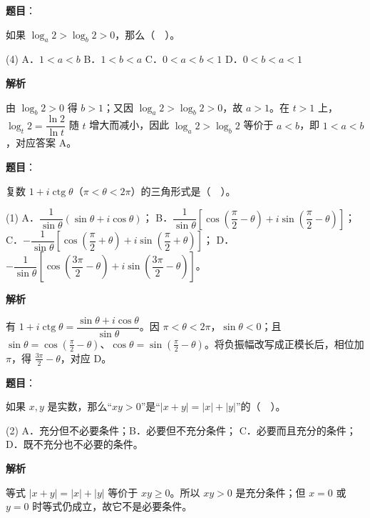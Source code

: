 \begin{answer}

\textbf{题目}：

如果 $\log_a2>\log_b2>0$，那么（　）。

\begin{gkopts}(4)
\task A．$1<a<b$
\task B．$1<b<a$
\task C．$0<a<b<1$
\task D．$0<b<a<1$
\end{gkopts}

\textbf{解析}

由 $\log_b 2>0$ 得 $b>1$；又因 $\log_a 2>\log_b 2>0$，故 $a>1$。在 $t>1$ 上，$\log_t 2=\dfrac{\ln2}{\ln t}$ 随 $t$ 增大而减小，因此 $\log_a 2>\log_b 2$ 等价于 $a<b$，即 $1<a<b$，对应答案 A。


\end{answer}
\begin{answer}

\textbf{题目}：

复数 $1+i\operatorname{ctg}\theta$（$\pi<\theta<2\pi$）的三角形式是（　）。

\begin{gkopts}(1)
\task A．$\dfrac1{\sin\theta}(\sin\theta+i\cos\theta)$；
\task B．$\dfrac1{\sin\theta}\left[\cos\left(\dfrac\pi2-\theta\right)+i\sin\left(\dfrac\pi2-\theta\right)\right]$；
\task C．$-\dfrac1{\sin\theta}\left[\cos\left(\dfrac\pi2+\theta\right)+i\sin\left(\dfrac\pi2+\theta\right)\right]$；
\task D．$-\dfrac1{\sin\theta}\left[\cos\left(\dfrac{3\pi}2-\theta\right)+i\sin\left(\dfrac{3\pi}2-\theta\right)\right]$。
\end{gkopts}

\textbf{解析}

有 $1+i\operatorname{ctg}\theta=\dfrac{\sin\theta+i\cos\theta}{\sin\theta}$。因 $\pi<\theta<2\pi$，$\sin\theta<0$；且 $\sin\theta=\cos(\frac\pi2-\theta)$、$\cos\theta=\sin(\frac\pi2-\theta)$。将负振幅改写成正模长后，相位加 $\pi$，得 $\frac{3\pi}2-\theta$，对应 D。


\end{answer}
\begin{answer}

\textbf{题目}：

如果 $x,y$ 是实数，那么“$xy>0$”是“$|x+y|=|x|+|y|$”的（　）。

\begin{gkopts}(2)
\task A．充分但不必要条件；B．必要但不充分条件；
\task C．必要而且充分的条件；D．既不充分也不必要的条件。
\end{gkopts}

\textbf{解析}

等式 $|x+y|=|x|+|y|$ 等价于 $xy\ge0$。所以 $xy>0$ 是充分条件；但 $x=0$ 或 $y=0$ 时等式仍成立，故它不是必要条件。


\end{answer}
